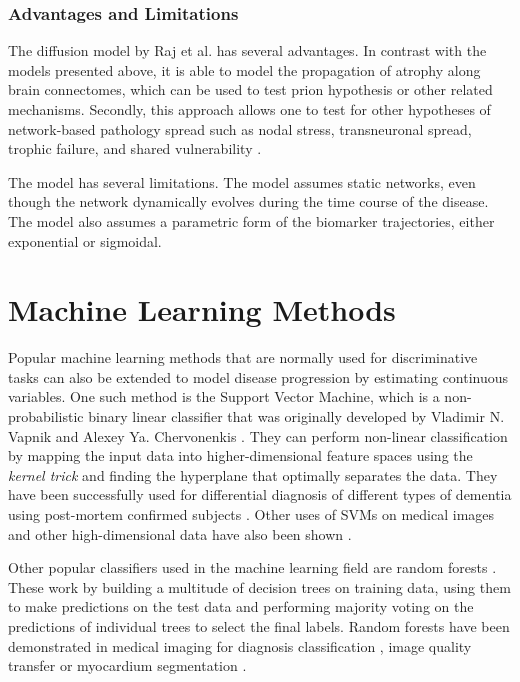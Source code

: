 \subsubsection{Advantages and Limitations}

The diffusion model by Raj et al. \cite{raj2012network} has several advantages. In contrast with the models presented above, it is able to model the propagation of atrophy along brain connectomes, which can be used to test prion hypothesis or other related mechanisms. Secondly, this approach allows one to test for other hypotheses of network-based pathology spread such as nodal stress, transneuronal spread, trophic failure, and shared vulnerability \cite{zhou2012predicting}.

The model has several limitations. The model assumes static networks, even though the network dynamically evolves during the time course of the disease. The model also assumes a parametric form of the biomarker trajectories, either exponential or sigmoidal. 

\section{Machine Learning Methods}
\label{sec:bckMac}

Popular machine learning methods that are normally used for discriminative tasks can also be extended to model disease progression by estimating continuous variables. One such method is the Support Vector Machine, which is a non-probabilistic binary linear classifier that was originally developed by Vladimir N. Vapnik and Alexey Ya. Chervonenkis \cite{vapnik2006estimation}. They can perform non-linear classification by mapping the input data into higher-dimensional feature spaces using the \emph{kernel trick} and finding the hyperplane that optimally separates the data. They have been successfully used for differential diagnosis of different types of dementia using post-mortem confirmed subjects \cite{kloppel2008automatic}. Other uses of SVMs on medical images and other high-dimensional data have also been shown \cite{lao2004morphological,fan2005classification,mourao2005classifying,kawasaki2007multivariate}.

Other popular classifiers used in the machine learning field are random forests \cite{ho1995random,breiman2001random}. These work by building a multitude of decision trees on training data, using them to make predictions on the test data and performing majority voting on the predictions of individual trees to select the final labels. Random forests have been demonstrated in medical imaging for diagnosis classification \cite{gray2013random}, image quality transfer \cite{alexander2014image} or myocardium segmentation \cite{lempitsky2009random}. 

